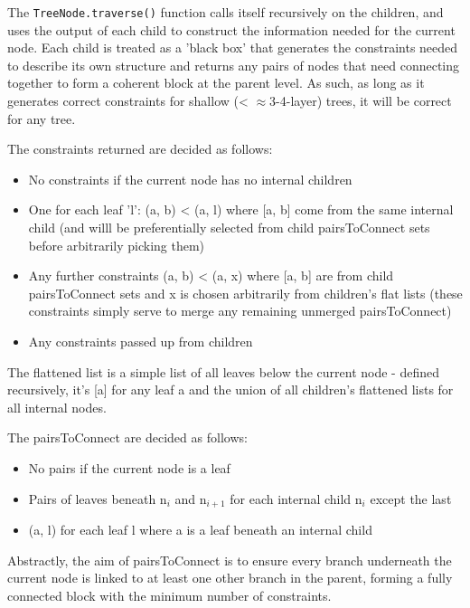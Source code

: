 \documentclass[11pt]{article} %
\begin{document}
The \texttt{TreeNode.traverse()} function calls itself recursively on the children, and uses the output of each child to construct the information needed for the current node. Each child is treated as a 'black box' that generates the constraints needed to describe its own structure and returns any pairs of nodes that need connecting together to form a coherent block at the parent level. As such, as long as it generates correct constraints for shallow (< $\approx$3-4-layer) trees, it will be correct for any tree.

The constraints returned are decided as follows:
\begin{itemize}
	\item No constraints if the current node has no internal children
	\item One for each leaf 'l': (a, b) < (a, l) where [a, b] come from the same internal child (and willl be preferentially selected from child pairsToConnect sets before arbitrarily picking them)
	\item Any further constraints (a, b) < (a, x) where [a, b] are from child pairsToConnect sets and x is chosen arbitrarily from children's flat lists (these constraints simply serve to merge any remaining unmerged pairsToConnect)
	\item Any constraints passed up from children
\end{itemize}

The flattened list is a simple list of all leaves below the current node - defined recursively, it's [a] for any leaf a and the union of all children's flattened lists for all internal nodes.

The pairsToConnect are decided as follows:
\begin{itemize}
	\item No pairs if the current node is a leaf
	\item Pairs of leaves beneath n$_i$ and n$_{i+1}$ for each internal child n$_i$ except the last
	\item (a, l) for each leaf l where a is a leaf beneath an internal child
\end{itemize}
Abstractly, the aim of pairsToConnect is to ensure every branch underneath the current node is linked to at least one other branch in the parent, forming a fully connected block with the minimum number of constraints.
\end{document}
